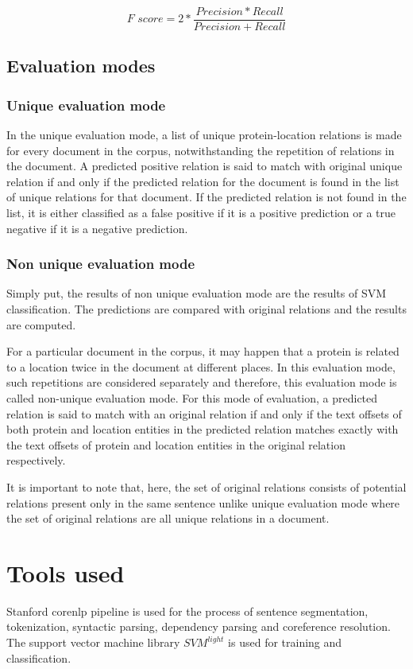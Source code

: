 $$
\textit{F score} = 2 * \frac{Precision * Recall}{Precision + Recall}
$$



\subsection{Evaluation modes} \label{subsec:Eval}

\subsubsection{Unique evaluation mode}\label{subsubsec:UniqEval}

In the unique evaluation mode, a list of unique protein-location relations is made for every document in the corpus, notwithstanding the repetition of relations in the document. A predicted positive relation is said to match with original unique relation if and only if the predicted relation for the document is found in the list of unique relations for that document. If the predicted relation is not found in the list, it is either classified as a false positive if it is a positive prediction or a true negative if it is a negative prediction.


\subsubsection{Non unique evaluation mode}\label{subsubsec:NonUniqEval}

Simply put, the results of non unique evaluation mode are the results of SVM classification. The predictions are compared with original relations and the results are computed.

For a particular document in the corpus, it may happen that a protein is related to a location twice in the document at different places. In this evaluation mode,  such repetitions are considered separately and therefore, this evaluation mode is called non-unique evaluation mode. For this mode of evaluation, a predicted relation is said to match with an original relation if and only if the text offsets of both protein and location entities in the predicted relation matches exactly with the text offsets of protein and location entities in the original relation respectively.

It is important to note that, here, the set of original relations consists of potential relations present only in the same sentence unlike unique evaluation mode where the set of original relations are all unique relations in a document.

\section{Tools used}\label{sec:tools}

Stanford corenlp pipeline \cite{manning2014stanford} is used for the process of sentence segmentation, tokenization, syntactic parsing, dependency parsing and coreference resolution. The support vector machine library $SVM^{light}$ \cite{joachims1999making} is used for training and classification.
